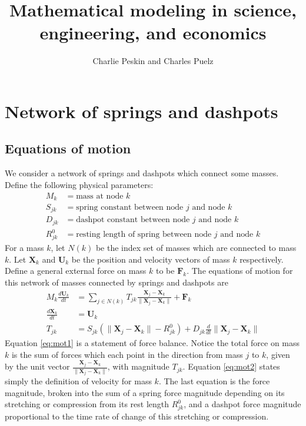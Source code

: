 \documentclass[10pt]{article}
\newcommand{\bs}[1]{{\boldsymbol #1}}
\begin{document}
\title{Mathematical modeling in science, engineering, and economics}
\author{Charlie Peskin and Charles Puelz}
\maketitle

\tableofcontents

\newpage
\section{Network of springs and dashpots}

\subsection{Equations of motion}
We consider a network of springs and dashpots which connect some masses.  Define the following physical parameters:
\begin{align*}
M_k &= \text{mass at node }k \\
S_{jk} &= \text{spring constant between node $j$ and node $k$} \\
D_{jk} &= \text{dashpot constant between node $j$ and node $k$} \\
R^0_{jk} &= \text{resting length of spring between node $j$ and node $k$} 
\end{align*}
For a mass $k$, let $N(k)$ be the index set of masses which are connected to mass $k$.  Let ${\bs X}_k$ and ${\bs U}_k$ be the position and velocity vectors of mass $k$ respectively.  Define a general external force on mass $k$ to be ${\bs F}_k$.  The equations of motion for this network of masses connected by springs and dashpots are
\begin{align}
\label{eq:mot1}
M_k \frac{d {\bs U}_k}{dt} &= \sum_{j \in N(k)} T_{jk} \frac{{\bs X}_j - {\bs X}_k}{\| {\bs X}_j - {\bs X}_k \|} + {\bs F}_k \\
\label{eq:mot2}
\frac{d {\bs X}_k}{dt} &= {\bs U}_k \\
\label{eq:mot3}
T_{jk} &= S_{jk} \left( \|{\bs X}_j - {\bs X}_k\| - R^0_{jk} \right) + D_{jk} \frac{d}{dt} \|{\bs X}_j - {\bs X}_k \|
\end{align}
Equation \eqref{eq:mot1} is a statement of force balance.  Notice the total force on mass $k$ is the sum of forces which each point in the direction from mass $j$ to $k$, given by the unit vector $\frac{{\bs X}_j - {\bs X}_k}{\| {\bs X}_j - {\bs X}_k \|}$, with magnitude $T_{jk}$.  Equation \eqref{eq:mot2} states simply the definition of velocity for mass $k$.  The last equation is the force magnitude, broken into the sum of a spring force magnitude depending on its stretching or compression from its rest length $R_{jk}^0$, and a dashpot force magnitude proportional to the time rate of change of this stretching or compression.
\end{document}

